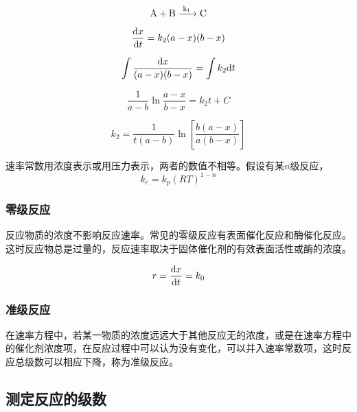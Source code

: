\begin{equation*}
    \ce{A + B ->[k_1] C}
\end{equation*}

\begin{equation*}
    \frac{\mathrm{d} x}{\mathrm{d} t} = k_2 (a - x) (b - x)
\end{equation*}

\begin{equation*}
    \int \frac{\mathrm{d} x}{(a - x)(b - x)} = \int k_2 \mathrm{d} t
\end{equation*}

\begin{equation*}
    \frac{1}{a - b} \ln \frac{a - x}{b - x} = k_2 t + C
\end{equation*}

\begin{equation*}
    k_2 = \frac{1}{t(a - b)} \ln \left[ \frac{b(a - x)}{a(b - x)} \right]
\end{equation*}

速率常数用浓度表示或用压力表示，两者的数值不相等。假设有某$n$级反应，
\begin{equation*}
    k_c = k_p (RT)^{1 - n}
\end{equation*}
\subsubsection{零级反应}
反应物质的浓度不影响反应速率。常见的零级反应有表面催化反应和酶催化反应。这时反应物总是过量的，反应速率取决于固体催化剂的有效表面活性或酶的浓度。

\begin{equation*}
    r = \frac{\mathrm{d} x}{\mathrm{d} t} = k_0
\end{equation*}

\subsubsection{准级反应}
在速率方程中，若某一物质的浓度远远大于其他反应无的浓度，或是在速率方程中的催化剂浓度项，在反应过程中可以认为没有变化，可以并入速率常数项，这时反应总级数可以相应下降，称为准级反应。

\subsection{测定反应的级数}
